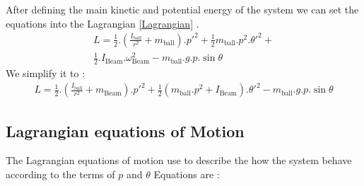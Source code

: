 \documentclass{article}
\begin{document}
After defining the main kinetic and potential energy of the system we can set the 
equations into the Lagrangian \ref{Lagrangian} .
\begin{multline}
		L = \frac{1}{2}.(\frac{I_{\text{ball}}}{r^2}+m_{\text{ball}}).p'^2 + \frac{1}{2} m_{\text{ball}}.p^2.\theta'^2 +\\
		\frac{1}{2}.I_{\text{Beam}}.\omega_{\text{Beam}}^2- m_{\text{ball}}.g.p.\sin{\theta}
\end{multline}
We simplify it to :
\begin{equation}
	\begin{split}
		L = \frac{1}{2}.(\frac{I_{\text{ball}}}{r^2}+m_{\text{Beam}}).p'^2 + \frac{1}{2}(m_{\text{ball}}.p^2 + I_{\text{Beam}}).\theta'^2 - m_{\text{ball}}.g.p.\sin{\theta} 
	\end{split}
\end{equation}

\newpage
\subsection{Lagrangian equations of Motion}
The Lagrangian equations of motion use to describe the how the system behave according to the terms of $p$ and $\theta$
Equations are :
\end{document}
